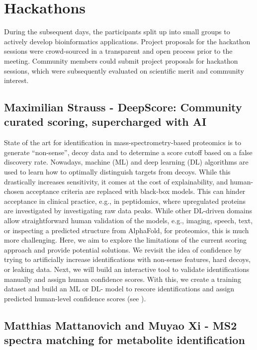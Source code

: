 \section{Hackathons}

During the subsequent days, the participants split up into small groups to actively develop bioinformatics applications. Project proposals for the hackathon sessions were crowd-sourced in a transparent and open process \citep{EuBIC2023GitHub} prior to the meeting.
Community members could submit project proposals for hackathon sessions, which were subsequently evaluated on scientific merit and community interest.


\subsection{Maximilian Strauss - DeepScore: Community curated scoring, supercharged with AI}

State of the art for identification in mass-spectrometry-based proteomics is to generate “non-sense”, decoy data and to determine a score cutoff based on a false discovery rate. Nowadays, machine (ML) and deep learning (DL) algorithms are used to learn how to optimally distinguish targets from decoys. While this drastically increases sensitivity, it comes at the cost of explainability, and human-chosen acceptance criteria are replaced with black-box models. This can hinder acceptance in clinical practice, e.g., in peptidomics, where upregulated proteins are investigated by investigating raw data peaks. While other DL-driven domains allow straightforward human validation of the models, e.g., imaging, speech, text, or inspecting a predicted structure from AlphaFold, for proteomics, this is much more challenging. Here, we aim to explore the limitations of the current scoring approach and provide potential solutions. We revisit the idea of confidence by trying to artificially increase identifications with non-sense features, hard decoys, or leaking data. Next, we will build an interactive tool to validate identifications manually and assign human confidence scores. With this, we create a training dataset and build an ML or DL- model to rescore identifications and assign predicted human-level confidence scores (see \citep{issue14}).


\subsection{Matthias Mattanovich and Muyao Xi - MS2 spectra matching for metabolite identification}

